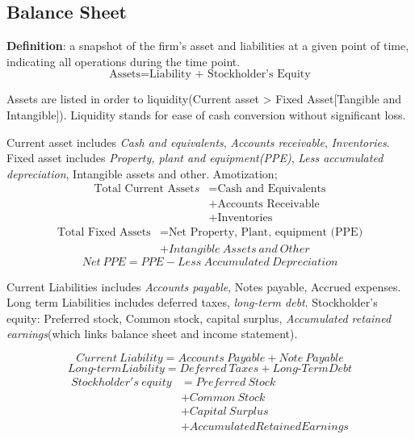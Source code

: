 \documentclass[10pt, a4paper]{article}
\begin{document}
        \subsection{Balance Sheet}
            \textbf{Definition}: a snapshot of the firm's asset and liabilities at a given point of time, indicating all operations during the time point. 
            $$\text{Assets} = \text{Liability + Stockholder's\ Equity}$$

            Assets are listed in order to liquidity(Current asset > Fixed Asset[Tangible and Intangible]). Liquidity stands for ease of cash conversion without significant loss.

            Current asset includes \emph{Cash and equivalents}, \emph{Accounts receivable}, \emph{Inventories}. Fixed asset includes \emph{Property, plant and equipment(PPE)}, \emph{Less accumulated depreciation}, Intangible assets and other. Amotization;
            \begin{align*}
                \text{Total\ Current\ Asset}s &= \text{Cash\ and\ Equivalents}\\
                                       &+ \text{Accounts\ Receivable}\\
                                       &+ \text{Inventories}  
            \end{align*}
            \begin{align*}
                \text{Total\ Fixed\ Assets} &= \text{Net Property,\ Plant,\ equipment\ (PPE)} \\
                                     &+ Intangible\ Assets\ and\ Other        
            \end{align*}
            $$Net\ PPE = PPE - Less\ Accumulated\ Depreciation$$

            Current Liabilities includes \emph{Accounts payable}, Notes payable, Accrued expenses. Long term Liabilities includes deferred taxes, \emph{long-term debt}. Stockholder's equity: Preferred stock, Common stock, capital surplus, \emph{Accumulated retained earnings}(which links balance sheet and income statement).
            
            $$Current\ Liability = Accounts\ Payable + Note\ Payable$$
            $$Long\text{-}term Liability = Deferred\ Taxes + Long\text{-}Term Debt$$
            \begin{align*}
                Stockholder's\ equity &= Preferred\ Stock \\
                                      &+ Common\ Stock\\
                                      &+ Capital\ Surplus \\ 
                                      &+ Accumulated Retained Earnings
            \end{align*}
        
\end{document}
